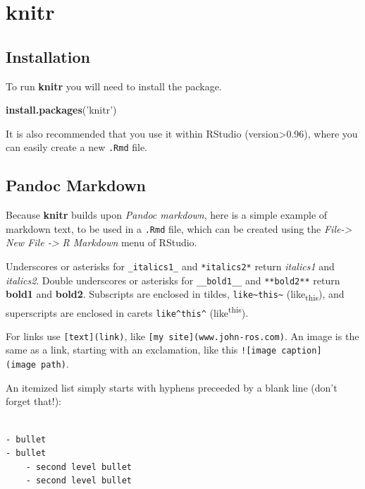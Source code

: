 \documentclass[]{book}
\newenvironment{Shaded}{\begin{snugshade}}{\end{snugshade}}
\newcommand{\KeywordTok}[1]{\textcolor[rgb]{0.13,0.29,0.53}{\textbf{#1}}}
\newcommand{\StringTok}[1]{\textcolor[rgb]{0.31,0.60,0.02}{#1}}
\newcommand{\NormalTok}[1]{#1}
\theoremstyle{definition}
\theoremstyle{definition}
\theoremstyle{definition}
\theoremstyle{remark}
\begin{document}
\section{knitr}\label{knitr}

\subsection{Installation}\label{installation}

To run \textbf{knitr} you will need to install the package.

\begin{Shaded}
\begin{Highlighting}[]
\KeywordTok{install.packages}\NormalTok{(}\StringTok{'knitr'}\NormalTok{)}
\end{Highlighting}
\end{Shaded}

It is also recommended that you use it within RStudio
(version\textgreater{}0.96), where you can easily create a new
\texttt{.Rmd} file.

\subsection{Pandoc Markdown}\label{pandoc-markdown}

Because \textbf{knitr} builds upon \emph{Pandoc markdown}, here is a
simple example of markdown text, to be used in a \texttt{.Rmd} file,
which can be created using the \emph{File-\textgreater{} New File
-\textgreater{} R Markdown} menu of RStudio.

Underscores or asterisks for \texttt{\_italics1\_} and
\texttt{*italics2*} return \emph{italics1} and \emph{italics2}. Double
underscores or asterisks for \texttt{\_\_bold1\_\_} and
\texttt{**bold2**} return \textbf{bold1} and \textbf{bold2}. Subscripts
are enclosed in tildes,
\texttt{like\textasciitilde{}this\textasciitilde{}}
(like\textsubscript{this}), and superscripts are enclosed in carets
\texttt{like\^{}this\^{}} (like\textsuperscript{this}).

For links use \texttt{{[}text{]}(link)}, like
\texttt{{[}my\ site{]}(www.john-ros.com)}. An image is the same as a
link, starting with an exclamation, like this
\texttt{!{[}image\ caption{]}(image\ path)}.

An itemized list simply starts with hyphens preceeded by a blank line
(don't forget that!):

\begin{verbatim}

- bullet
- bullet
    - second level bullet
    - second level bullet
\end{verbatim}
\end{document}
